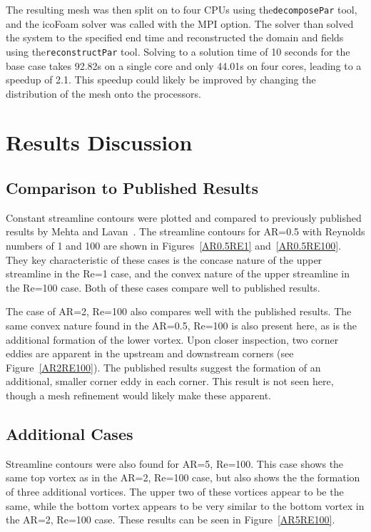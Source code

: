 \documentclass[twocolumn,10pt]{asme2ej}
\begin{document}
The resulting mesh was then split on to four CPUs using the\lstinline{decomposePar} tool, and the icoFoam solver was called with the MPI option. The solver than solved the system to the specified end time and reconstructed the domain and fields using the\lstinline{reconstructPar} tool. Solving to a solution time of 10 seconds for the base case takes 92.82s on a single core and only 44.01s on four cores, leading to a speedup of 2.1. This speedup could likely be improved by changing the distribution of the mesh onto the processors.

\section{Results Discussion}
\subsection{Comparison to Published Results}
Constant streamline contours were plotted and compared to previously published results by Mehta and Lavan~\cite{mehta1969flow}. The streamline contours for AR=0.5 with Reynolds numbers of 1 and 100 are shown in Figures~\ref{AR0.5RE1} and~\ref{AR0.5RE100}. They key characteristic of these cases is the concase nature of the upper streamline in the Re=1 case, and the convex nature of the upper streamline in the Re=100 case. Both of these cases compare well to published results.

The case of AR=2, Re=100 also compares well with the published results. The same convex nature found in the AR=0.5, Re=100 is also present here, as is the additional formation of the lower vortex. Upon closer inspection, two corner eddies are apparent in the upstream and downstream corners (see Figure~\ref{AR2RE100}). The published results suggest the formation of an additional, smaller corner eddy in each corner. This result is not seen here, though a mesh refinement would likely make these apparent.

\subsection{Additional Cases}
Streamline contours were also found for AR=5, Re=100. This case shows the same top vortex as in the AR=2, Re=100 case, but also shows the the formation of three additional vortices. The upper two of these vortices appear to be the same, while the bottom vortex appears to be very similar to the bottom vortex in the AR=2, Re=100 case. These results can be seen in Figure~\ref{AR5RE100}.
\end{document}
